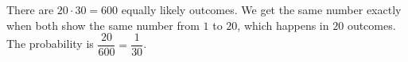 There are $20\cdot30=600$ equally likely outcomes. We get the same number exactly when both show the same number from $1$ to $20$, which happens in $20$ outcomes. The probability is $\dfrac{20}{600}=\boxed{\dfrac1{30}}$.
